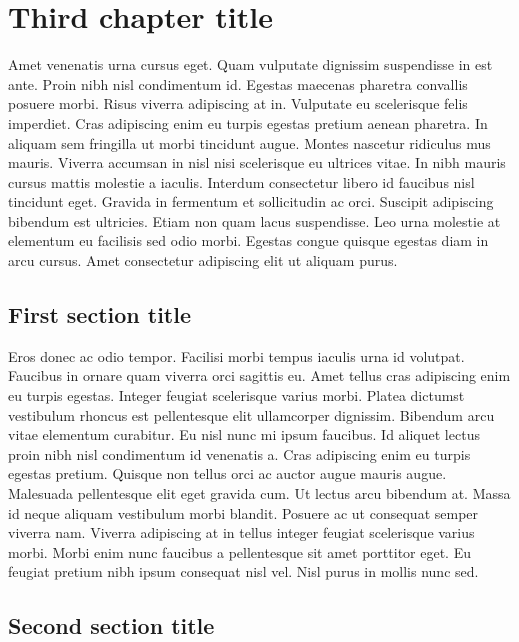 \chapter{Third chapter title}

Amet venenatis urna cursus eget. Quam vulputate dignissim suspendisse in est ante. Proin nibh nisl condimentum id. Egestas maecenas 
pharetra convallis posuere morbi. Risus viverra adipiscing at in. Vulputate eu scelerisque felis imperdiet. Cras adipiscing enim eu 
turpis egestas pretium aenean pharetra. In aliquam sem fringilla ut morbi tincidunt augue. Montes nascetur ridiculus mus mauris. Viverra 
accumsan in nisl nisi scelerisque eu ultrices vitae. In nibh mauris cursus mattis molestie a iaculis. Interdum consectetur libero id 
faucibus nisl tincidunt eget. Gravida in fermentum et sollicitudin ac orci. Suscipit adipiscing bibendum est ultricies. Etiam non quam 
lacus suspendisse. Leo urna molestie at elementum eu facilisis sed odio morbi. Egestas congue quisque egestas diam in arcu cursus. Amet 
consectetur adipiscing elit ut aliquam purus.

\section{First section title}

Eros donec ac odio tempor. Facilisi morbi tempus iaculis urna id volutpat. Faucibus in ornare quam viverra orci sagittis eu. Amet 
tellus cras adipiscing enim eu turpis egestas. Integer feugiat scelerisque varius morbi. Platea dictumst vestibulum rhoncus est 
pellentesque elit ullamcorper dignissim. Bibendum arcu vitae elementum curabitur. Eu nisl nunc mi ipsum faucibus. Id aliquet lectus 
proin nibh nisl condimentum id venenatis a. Cras adipiscing enim eu turpis egestas pretium. Quisque non tellus orci ac auctor augue 
mauris augue. Malesuada pellentesque elit eget gravida cum. Ut lectus arcu bibendum at. Massa id neque aliquam vestibulum morbi 
blandit. Posuere ac ut consequat semper viverra nam. Viverra adipiscing at in tellus integer feugiat scelerisque varius morbi. 
Morbi enim nunc faucibus a pellentesque sit amet porttitor eget. Eu feugiat pretium nibh ipsum consequat nisl vel. Nisl purus in 
mollis nunc sed.

\section{Second section title}

